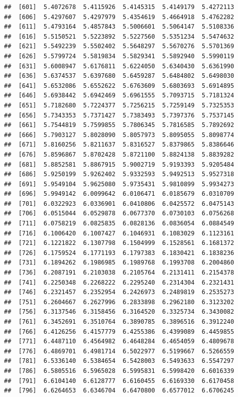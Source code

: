 \documentclass[
  11pt]{report}
\begin{document}
\begin{itemize}
\begin{verbatim}
##  [601]  5.4072678  5.4115926  5.4145315  5.4149179  5.4272113
##  [606]  5.4297607  5.4297979  5.4354619  5.4664918  5.4762282
##  [611]  5.4793164  5.4857843  5.5006601  5.5064147  5.5108336
##  [616]  5.5150521  5.5223892  5.5227560  5.5351234  5.5474632
##  [621]  5.5492239  5.5502402  5.5648297  5.5670276  5.5701369
##  [626]  5.5799724  5.5819834  5.5829341  5.5892940  5.5990119
##  [631]  5.6008947  5.6176811  5.6224050  5.6340430  5.6361990
##  [636]  5.6374537  5.6397680  5.6459287  5.6484802  5.6498030
##  [641]  5.6532086  5.6552622  5.6763609  5.6803693  5.6914895
##  [646]  5.6938442  5.6942469  5.6961555  5.7093715  5.7181324
##  [651]  5.7182680  5.7224377  5.7256215  5.7259149  5.7325353
##  [656]  5.7343353  5.7371427  5.7383493  5.7397376  5.7537145
##  [661]  5.7544819  5.7599855  5.7806345  5.7816585  5.7892692
##  [666]  5.7903127  5.8028090  5.8057973  5.8095055  5.8098774
##  [671]  5.8160256  5.8211637  5.8316527  5.8379865  5.8386646
##  [676]  5.8596867  5.8702428  5.8721100  5.8824138  5.8839282
##  [681]  5.8852581  5.8867915  5.9002719  5.9193393  5.9205484
##  [686]  5.9250199  5.9262402  5.9332593  5.9492513  5.9527318
##  [691]  5.9549104  5.9625080  5.9735431  5.9810899  5.9934273
##  [696]  5.9949142  6.0099642  6.0106471  6.0185679  6.0310709
##  [701]  6.0322923  6.0336901  6.0410806  6.0425572  6.0475143
##  [706]  6.0515044  6.0529878  6.0677370  6.0730103  6.0756268
##  [711]  6.0758219  6.0825835  6.0828136  6.0836054  6.0884549
##  [716]  6.1006420  6.1007427  6.1046931  6.1083029  6.1123161
##  [721]  6.1221822  6.1307798  6.1504999  6.1528561  6.1681372
##  [726]  6.1759524  6.1771193  6.1797383  6.1830421  6.1838236
##  [731]  6.1894262  6.1986985  6.1989768  6.1993708  6.2004860
##  [736]  6.2087191  6.2103038  6.2105764  6.2131411  6.2154378
##  [741]  6.2250348  6.2268222  6.2295240  6.2314304  6.2321431
##  [746]  6.2321457  6.2352954  6.2426973  6.2489819  6.2535273
##  [751]  6.2604667  6.2627996  6.2833898  6.2962180  6.3123202
##  [756]  6.3137546  6.3158456  6.3164520  6.3325734  6.3430082
##  [761]  6.3452691  6.3510764  6.3890785  6.3896516  6.3912240
##  [766]  6.4126256  6.4157779  6.4255386  6.4399089  6.4459855
##  [771]  6.4487110  6.4564982  6.4648284  6.4654059  6.4809678
##  [776]  6.4869701  6.4981714  6.5022977  6.5199667  6.5266559
##  [781]  6.5336140  6.5384654  6.5428003  6.5493633  6.5547297
##  [786]  6.5805516  6.5965028  6.5995831  6.5998420  6.6016339
##  [791]  6.6104140  6.6128777  6.6160455  6.6169330  6.6170458
##  [796]  6.6264653  6.6346704  6.6470800  6.6577012  6.6706245

\end{verbatim}
\end{itemize}
\end{document}
